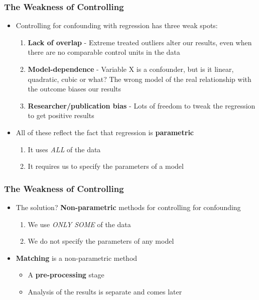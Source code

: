 \documentclass[xcolor=x11names,compress]{beamer}\usepackage[]{graphicx}\usepackage[]{color}
\renewcommand{\(}{\begin{columns}}
\renewcommand{\)}{\end{columns}}
\newcommand{\<}[1]{\begin{column}{#1}}
\renewcommand{\>}{\end{column}}
\begin{document}
\begin{frame}
\frametitle{The Weakness of Controlling}
\begin{itemize}
\item Controlling for confounding with regression has three weak spots:
\pause
\begin{enumerate}
\item \textbf{Lack of overlap} - Extreme treated outliers alter our results, even when there are no comparable control units in the data
\pause
\item \textbf{Model-dependence} - Variable X is a confounder, but is it linear, quadratic, cubic or what? The wrong model of the real relationship with the outcome biases our results
\pause
\item \textbf{Researcher/publication bias} - Lots of freedom to tweak the regression to get positive results
\end{enumerate}
\item All of these reflect the fact that regression is \textbf{parametric}
\pause
\begin{enumerate}
\item It uses \textit{ALL} of the data
\item It requires us to specify the parameters of a model
\end{enumerate}
\end{itemize}
\end{frame}

\begin{frame}
\frametitle{The Weakness of Controlling}
\begin{itemize}
\item The solution? \pause \textbf{Non-parametric} methods for controlling for confounding
\pause
\begin{enumerate}
\item We use \textit{ONLY SOME} of the data
\item We do not specify the parameters of any model
\end{enumerate}
\pause
\item \textbf{Matching} is a non-parametric method
\pause
\begin{itemize}
\item A \textbf{pre-processing} stage 
\item Analysis of the results is separate and comes later
\end{itemize}
\end{itemize}
\end{frame}
\end{document}
